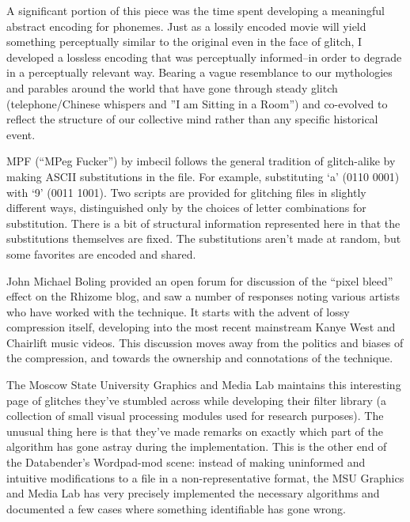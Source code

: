 \documentclass{thesis}
\begin{document}
	A significant portion of this piece was the time spent developing a meaningful abstract encoding for phonemes. Just as a lossily encoded movie will yield something perceptually similar to the original even in the face of glitch, I developed a lossless encoding that was perceptually informed--in order to degrade in a perceptually relevant way. Bearing a vague resemblance to our mythologies and parables around the world that have gone through steady glitch (telephone/Chinese whispers and ''I am Sitting in a Room'') and co-evolved to reflect the structure of our collective mind rather than any specific historical event.
	
	\cite{imbecil_mpeg_2004}
	MPF (``MPeg Fucker'') by imbecil follows the general tradition of glitch-alike by making ASCII substitutions in the file. For example, substituting `a' (0110 0001) with `9' (0011 1001). Two scripts are provided for glitching files in slightly different ways, distinguished only by the choices of letter combinations for substitution. There is a bit of structural information represented here in that the substitutions themselves are fixed. The substitutions aren't made at random, but some favorites are encoded and shared.
	
	\cite{john_michael_boling_rhizome_????}
	John Michael Boling provided an open forum for discussion of the ``pixel bleed'' effect on the Rhizome blog, and saw a number of responses noting various artists who have worked with the technique. It starts with the advent of lossy compression itself, developing into the most recent mainstream Kanye West and Chairlift music videos. This discussion moves away from the politics and biases of the compression, and towards the ownership and connotations of the technique.
	
	\cite{nikolai_trunichkin_and_dr._dmitriy_vatolin_crazy_????}
	The Moscow State University Graphics and Media Lab maintains this interesting page of glitches they've stumbled across while developing their filter library (a collection of small visual processing modules used for research purposes). The unusual thing here is that they've made remarks on exactly which part of the algorithm has gone astray during the implementation. This is the other end of the Databender's Wordpad-mod scene: instead of making uninformed and intuitive modifications to a file in a non-representative format, the MSU Graphics and Media Lab has very precisely implemented the necessary algorithms and documented a few cases where something identifiable has gone wrong.
	
\end{document}
